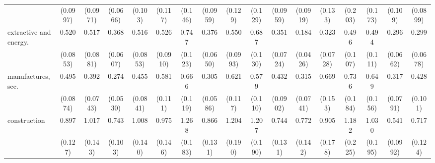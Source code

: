 {\begin{tabular}{l*{16}{c}}
                    &    (0.0997)         &    (0.0971)         &    (0.0666)         &     (0.103)         &     (0.117)         &     (0.146)         &    (0.0959)         &     (0.129)         &     (0.129)         &    (0.0959)         &    (0.0919)         &     (0.133)         &     (0.203)         &     (0.173)         &     (0.109)         &    (0.0899)         \\
[1em]
extractive and energy.&       0.520\sym{***}&       0.517\sym{***}&       0.368\sym{***}&       0.516\sym{***}&       0.526\sym{***}&       0.747         &       0.376\sym{***}&       0.550\sym{***}&       0.687\sym{*}  &       0.351\sym{***}&       0.184\sym{***}&       0.323\sym{***}&       0.496\sym{**} &       0.494\sym{**} &       0.296\sym{***}&       0.299\sym{***}\\
                    &    (0.0853)         &    (0.0881)         &    (0.0607)         &    (0.0853)         &    (0.0910)         &     (0.123)         &    (0.0650)         &    (0.0993)         &     (0.130)         &    (0.0724)         &    (0.0426)         &    (0.0728)         &     (0.107)         &     (0.111)         &    (0.0662)         &    (0.0678)         \\
[1em]
manufactures, sec.  &       0.495\sym{***}&       0.392\sym{***}&       0.274\sym{***}&       0.455\sym{***}&       0.581\sym{**} &       0.666\sym{*}  &       0.305\sym{***}&       0.621\sym{*}  &       0.579\sym{**} &       0.432\sym{***}&       0.315\sym{***}&       0.669         &       0.736         &       0.649         &       0.317\sym{***}&       0.428\sym{***}\\
                    &    (0.0874)         &    (0.0743)         &    (0.0530)         &    (0.0841)         &     (0.111)         &     (0.119)         &    (0.0586)         &     (0.117)         &     (0.110)         &    (0.0902)         &    (0.0741)         &     (0.153)         &     (0.184)         &     (0.156)         &    (0.0791)         &     (0.101)         \\
[1em]
construction        &       0.897         &       1.017         &       0.743\sym{*}  &       1.008         &       0.975         &       1.268         &       0.866         &       1.204         &       1.207         &       0.744         &       0.772         &       0.905         &       1.182         &       1.030         &       0.541\sym{***}&       0.717         \\
                    &     (0.127)         &     (0.143)         &     (0.103)         &     (0.140)         &     (0.146)         &     (0.183)         &     (0.131)         &     (0.190)         &     (0.190)         &     (0.131)         &     (0.142)         &     (0.178)         &     (0.225)         &     (0.195)         &    (0.0992)         &     (0.124)         \\

\end{tabular}}
